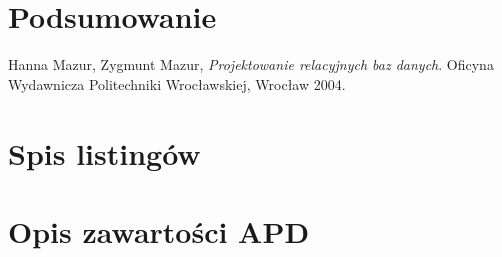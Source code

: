 \documentclass[12pt,twoside]{report}
\begin{document}
\chapter{Podsumowanie}
\begin{thebibliography}{9}
	
	Hanna Mazur, Zygmunt Mazur,
	\emph{Projektowanie relacyjnych baz danych}.
	Oficyna Wydawnicza Politechniki Wrocławskiej, Wrocław 2004.
	
\end{thebibliography}
\listoffigures
\chapter{Spis listingów}
\listoftables
\chapter{Opis zawartości APD}
\end{document}
